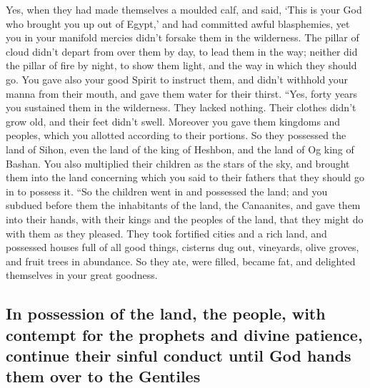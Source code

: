 Yes, when they had made themselves a moulded calf, and said, `This is
your God who brought you up out of Egypt,' and had committed awful
blasphemies,  yet you in your manifold mercies didn't
forsake them in the wilderness. The pillar of cloud didn't depart from
over them by day, to lead them in the way; neither did the pillar of
fire by night, to show them light, and the way in which they should go.
 You gave also your good Spirit to instruct them, and
didn't withhold your manna from their mouth, and gave them water for
their thirst.  ``Yes, forty years you sustained them in
the wilderness. They lacked nothing. Their clothes didn't grow old, and
their feet didn't swell.  Moreover you gave them kingdoms
and peoples, which you allotted according to their portions. So they
possessed the land of Sihon, even the land of the king of Heshbon, and
the land of Og king of Bashan.  You also multiplied their
children as the stars of the sky, and brought them into the land
concerning which you said to their fathers that they should go in to
possess it.  ``So the children went in and possessed the
land; and you subdued before them the inhabitants of the land, the
Canaanites, and gave them into their hands, with their kings and the
peoples of the land, that they might do with them as they pleased.
 They took fortified cities and a rich land, and
possessed houses full of all good things, cisterns dug out, vineyards,
olive groves, and fruit trees in abundance. So they ate, were filled,
became fat, and delighted themselves in your great goodness.

\hypertarget{in-possession-of-the-land-the-people-with-contempt-for-the-prophets-and-divine-patience-continue-their-sinful-conduct-until-god-hands-them-over-to-the-gentiles}{%
\subsection{In possession of the land, the people, with contempt for the
prophets and divine patience, continue their sinful conduct until God
hands them over to the
Gentiles}\label{in-possession-of-the-land-the-people-with-contempt-for-the-prophets-and-divine-patience-continue-their-sinful-conduct-until-god-hands-them-over-to-the-gentiles}}

